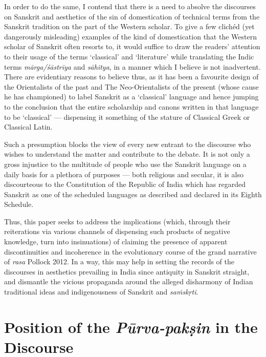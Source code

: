 In order to do the same, I contend that there is a need to absolve the discourses on Sanskrit and aesthetics of the sin of domestication of technical terms from the Sanskrit tradition on the part of the Western scholar. To give a few clichéd (yet dangerously misleading) examples of the kind of domestication that the Western scholar of Sanskrit often resorts to, it would suffice to draw the readers’ attention to their usage of the terms ‘classical’ and ‘literature’ while translating the Indic terms \textsl{mārga/śāstrīya} and \textsl{sāhitya}, in a manner which I believe is not inadvertent. There are evidentiary reasons to believe thus, as it has been a favourite design of the Orientalists of the past and The Neo-Orientalists of the present (whose cause he has championed) to label Sanskrit as a ‘classical’ language and hence jumping to the conclusion that the entire scholarship and canons written in that language to be ‘classical’ --- dispensing it something of the stature of Classical Greek or Classical Latin. 

Such a presumption blocks the view of every new entrant to the discourse who wishes to understand the matter and contribute to the debate. It is not only a gross injustice to the multitude of people who use the Sanskrit language on a daily basis for a plethora of purposes --- both religious and secular, it is also discourteous to the Constitution of the Republic of India which has regarded Sanskrit as one of the scheduled languages as described and declared in its Eighth Schedule. 

Thus, this paper seeks to address the implications (which, through their reiterations via various channels of dispensing such products of negative knowledge, turn into insinuations) of claiming the presence of apparent discontinuities and incoherence in the evolutionary course of the grand narrative of \textsl{rasa} Pollock 2012. In a way, this may help in setting the records of the discourses in aesthetics prevailing in India since antiquity in Sanskrit straight, and dismantle the vicious propaganda around the alleged disharmony of Indian traditional ideas and indigenousness of Sanskrit and \textsl{saṁskṛti}.\\[-21pt]

\section*{Position of the \textsl{Pūrva-pakṣin} in the Discourse}

